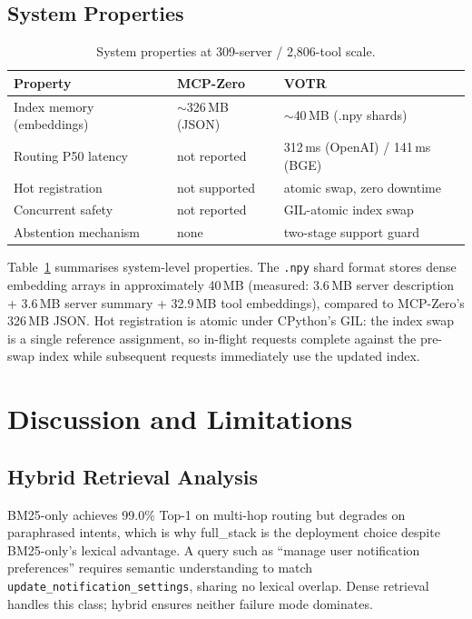 \documentclass[sigconf,anonymous,review]{acmart}
\newcommand{\votr}{\textsc{VOTR}\xspace}
\newcommand{\mcpzero}{MCP-Zero\xspace}
\begin{document}
\subsection{System Properties}

\begin{table}[t]
\centering
\small
\caption{System properties at 309-server / 2,806-tool scale.}
\label{tab:system}
\begin{tabular}{@{}lll@{}}
\toprule
Property & \mcpzero & \votr \\
\midrule
Index memory (embeddings) & $\sim$326\,MB (JSON) & $\sim$40\,MB (.npy shards) \\
Routing P50 latency    & not reported         & 312\,ms (OpenAI) / 141\,ms (BGE) \\
Hot registration       & not supported        & atomic swap, zero downtime \\
Concurrent safety      & not reported         & GIL-atomic index swap \\
Abstention mechanism   & none                 & two-stage support guard \\
\bottomrule
\end{tabular}
\end{table}

Table~\ref{tab:system} summarises system-level properties.
The \texttt{.npy} shard format stores dense embedding arrays in approximately 40\,MB
(measured: 3.6\,MB server description + 3.6\,MB server summary + 32.9\,MB tool
embeddings), compared to \mcpzero's 326\,MB JSON.
Hot registration is atomic under CPython's GIL: the index swap is a single
reference assignment, so in-flight requests complete against the pre-swap index
while subsequent requests immediately use the updated index.

\section{Discussion and Limitations}

\subsection{Hybrid Retrieval Analysis}
BM25-only achieves 99.0\% Top-1 on multi-hop routing but degrades on paraphrased
intents, which is why full\_stack is the deployment choice despite BM25-only's
lexical advantage.
A query such as ``manage user notification preferences'' requires semantic
understanding to match \texttt{update\_notification\_settings}, sharing no lexical
overlap.
Dense retrieval handles this class; hybrid ensures neither failure mode dominates.
\end{document}
